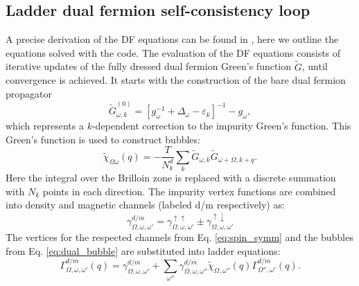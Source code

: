 \documentclass[3p,times,procedia]{elsarticle}
\begin{document}
\subsection{Ladder dual fermion self-consistency loop}
A precise derivation of the DF equations can be found in \cite{Hafermann2012, Antipov2014}, here we outline the equations solved with the code. The evaluation of the DF equations consists of iterative updates of the fully dressed dual fermion Green's function $\tilde G$, until convergence is achieved. It starts with the construction of the bare dual fermion propagator
\begin{equation}
\tilde G^{(0)}_{\omega,k} = \left[g_{\omega}^{-1} + \Delta_\omega - \varepsilon_k\right]^{-1} - g_{\omega}, \label{eq:gd0}
\end{equation}
which represents a $k$-dependent correction to the impurity Green's function. This Green's function is used to construct bubbles: 
\begin{equation}\label{eq:dual_bubble}
\tilde \chi_{\Omega\omega}(q) = -\frac{T}{N_k^d} \sum_k \tilde G_{\omega, k} \tilde G_{\omega + \Omega, k+q}.
\end{equation}
Here the integral over the Brilloin zone is replaced with a discrete summation with $N_k$ points in each direction. The impurity vertex functions are combined into density and magnetic channels (labeled d/m respectively) as: 
\begin{equation}\label{eq:spin_symm}
\gamma^{d/m}_{\Omega,\omega,\omega'} = \gamma^{\uparrow\uparrow}_{\Omega,\omega,\omega'} \pm \gamma^{\uparrow\downarrow}_{\Omega,\omega,\omega'}
\end{equation}
The vertices for the respected channels from Eq. \ref{eq:spin_symm} and the bubbles from Eq. \ref{eq:dual_bubble} are substituted into ladder equations:
\begin{equation}\label{eq:dual_ladder}
\Gamma^{d/m}_{\Omega,\omega,\omega'}(q) = \gamma^{d/m}_{\Omega,\omega,\omega'} + \sum_{\omega''} \gamma^{d/m}_{\Omega,\omega,\omega''} \tilde\chi_{\Omega,\omega''}(q) \Gamma^{d/m}_{\Omega'',\omega'}(q).
\end{equation}
\end{document}
